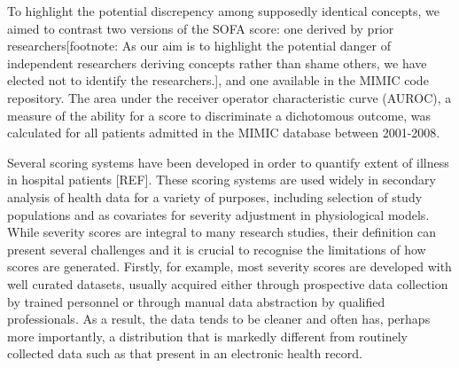 \documentclass{elsart}
\begin{document}
To highlight the potential discrepency among supposedly identical concepts, we aimed to contrast two versions of the SOFA score: one derived by prior researchers[footnote: As our aim is to highlight the potential danger of independent researchers deriving concepts rather than shame others, we have elected not to identify the researchers.], and one available in the MIMIC code repository. The area under the receiver operator characteristic curve (AUROC), a measure of the ability for a score to discriminate a dichotomous outcome, was calculated for all patients admitted in the MIMIC database between 2001-2008.




Several scoring systems have been developed in order to quantify extent of illness in hospital patients [REF]. These scoring systems are used widely in secondary analysis of health data for a variety of purposes, including selection of study populations and as covariates for severity adjustment in physiological models. While severity scores are integral to many research studies, their definition can present several challenges and it is crucial to recognise the limitations of how scores are generated. Firstly, for example, most severity scores are developed with well curated datasets, usually acquired either through prospective data collection by trained personnel or through manual data abstraction by qualified professionals. As a result, the data tends to be cleaner and often has, perhaps more importantly, a distribution that is markedly different from routinely collected data such as that present in an electronic health record.
\end{document}
